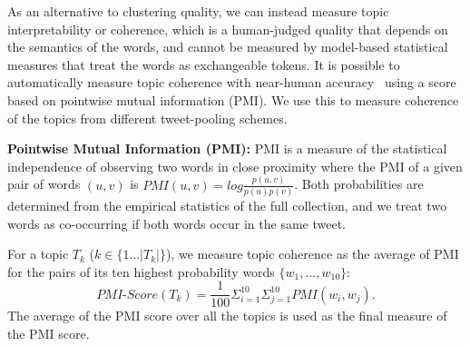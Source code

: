 \documentclass{sig-alternate}
\begin{document}
As an alternative to clustering quality, we can instead measure topic interpretability
or coherence, which
is a human-judged quality that depends on
the semantics of the words, and cannot be measured by model-based
statistical measures that treat the words as exchangeable tokens.  It
is possible to automatically measure topic coherence with near-human
accuracy~\cite{baldwin10} using a score based on pointwise mutual
information (PMI).  We use this to measure coherence of the topics
from different tweet-pooling schemes.

\vspace{1mm} \noindent \textbf{Pointwise Mutual Information (PMI):} PMI is a
measure of the statistical independence of observing two words in
close proximity where the PMI of a given pair of words $(u,v)$ is $PMI
(u,v) = log \frac{p(u,v)}{p(u)p(v)}$.  Both probabilities are
determined from the empirical statistics of the full collection, and
we treat two words as co-occurring if both words occur in the same
tweet.

For a topic $T_k$ ($k \in \{ 1 \ldots |T_k| \}$), we measure topic
coherence as the average of PMI for the pairs of its ten highest
probability words $\{w_1,...,w_{10}\}$:
\begin{equation*}
	\mathit{PMI}\text{-}\mathit{Score}(T_k) = \frac{1}{100} \Sigma_{i=1}^{10} \Sigma_{j=1}^{10} PMI(w_i,w_j) .
\end{equation*}
The average of the PMI score over all the topics is used as the final
measure of the PMI score.

%
\end{document}
